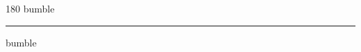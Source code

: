 
\begin{frame}
\begin{center}
\begin{turn}{180}
{\fontsize{2.5cm}{1em}\selectfont bumble}
\end{turn}
\vspace{1em}\par  
\hrule
\vspace{1em}\par  
{\fontsize{2.5cm}{1em}\selectfont bumble}
\end{center}
\end{frame}
